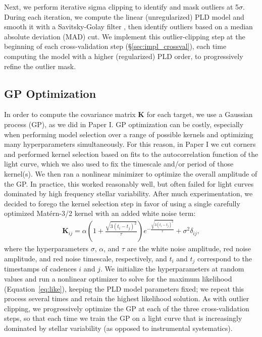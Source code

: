 \documentclass[]{emulateapj}
\begin{document}
Next, we perform iterative sigma clipping to identify and mask outliers at 5$\sigma$.
During each iteration, we compute the linear (unregularized) PLD model and smooth it with
a Savitsky-Golay filter \citep{SavitskyGolay64}, then identify outliers based on a 
median absolute deviation (MAD) cut. We implement this outlier-clipping step at the
beginning of each cross-validation step (\S\ref{sec:impl_crossval}), each time computing
the model with a higher (regularized) PLD order, to progressively refine the outlier mask.

\subsection{GP Optimization}
\label{sec:impl_gp}
In order to compute the covariance matrix $\mathbf{K}$ for each target, we use a Gaussian
process (GP), as we did in Paper I. GP optimization can be costly, especially when
performing model selection over a range of possible kernels and optimizing many
hyperparameters simultaneously. For this reason, in Paper I we cut corners and performed
kernel selection based on fits to the autocorrelation function of the light curve, which
we also used to fix the timescale and/or period of those kernel(s). We then ran a nonlinear
minimizer to optimize the overall amplitude of the GP. In practice, this worked reasonably
well, but often failed for light curves dominated by high frequency stellar variability.
After much experimentation, we decided to forego the kernel selection step in favor of
using a single carefully optimized Mat\'ern-3/2 kernel with an added white noise term:
%
\begin{align}
\mathbf{K}_{ij} = \alpha \left(1 + \frac{\sqrt{3(t_i - t_j)^2}}{\tau}\right) e^{-\frac{\sqrt{3(t_i - t_j)^2}}{\tau}} + \sigma^2\delta_{ij},
\end{align}
%
where the hyperparameters $\sigma$, $\alpha$, and $\tau$ are the white noise amplitude,
red noise amplitude, and red noise timescale, respectively, and $t_i$ and $t_j$ correspond
to the timestamps of cadences $i$ and $j$. We initialize the hyperparameters at random
values and run a nonlinear optimizer to solve for the maximum likelihood (Equation~\ref{eq:like}),
keeping the PLD model parameters fixed; we repeat this process several times and retain the 
highest likelihood solution. As with outlier clipping, we progressively optimize the GP
at each of the three cross-validation steps, so that each time we train the GP on a 
light curve that is increasingly dominated by stellar variability (as opposed to instrumental
systematics).
\end{document}
